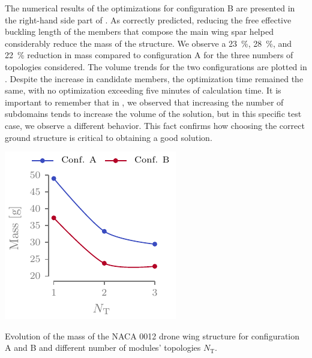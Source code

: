 The numerical results of the optimizations for configuration B are presented in the right-hand side part of . As correctly predicted, reducing the free effective buckling length of the members that compose the main wing spar helped considerably reduce the mass of the structure. We observe a \qty{23}{\percent}, \qty{28}{\percent}, and \qty{22}{\percent} reduction in mass compared to configuration A for the three numbers of topologies considered. The volume trends for the two configurations are plotted in . Despite the increase in candidate members, the optimization time remained the same, with no optimization exceeding five minutes of calculation time. It is important to remember that in , we observed that increasing the number of subdomains tends to increase the volume of the solution, but in this specific test case, we observe a different behavior. This fact confirms how choosing the correct ground structure is critical to obtaining a good solution.

\begin{marginfigure}
    \centering
    \includegraphics[width=\linewidth]{figures/07_aeronautic/00_NACA_vol_crv/vol.pdf}
    \caption{Evolution of the mass of the NACA 0012 drone wing structure for configuration A and B and different number of modules' topologies $N_\text{T}$.}
    \label{fig:07_mass_b}
\end{marginfigure}

